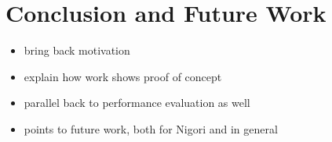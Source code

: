 \chapter{Conclusion and Future Work} \label{chapter:conclusion}

\begin{itemize}
  \item bring back motivation
  \item explain how work shows proof of concept
  \item parallel back to performance evaluation as well
  \item points to future work, both for Nigori and in general
\end{itemize}
